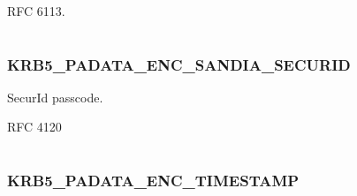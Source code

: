 \documentclass[letterpaper,10pt,english]{sphinxmanual}
\begin{document}
RFC 6113.

\begin{tabulary}{\linewidth}{|L|L|}
\hline

 & 
\\\hline
\end{tabulary}



\subsubsection{KRB5\_PADATA\_ENC\_SANDIA\_SECURID}
\label{appdev/refs/macros/KRB5_PADATA_ENC_SANDIA_SECURID:krb5-padata-enc-sandia-securid-data}\label{appdev/refs/macros/KRB5_PADATA_ENC_SANDIA_SECURID:krb5-padata-enc-sandia-securid}\label{appdev/refs/macros/KRB5_PADATA_ENC_SANDIA_SECURID::doc}

\begin{fulllineitems}
\label{appdev/refs/macros/KRB5_PADATA_ENC_SANDIA_SECURID:KRB5_PADATA_ENC_SANDIA_SECURID}
\end{fulllineitems}


SecurId passcode.

RFC 4120

\begin{tabulary}{\linewidth}{|L|L|}
\hline

 & 
\\\hline
\end{tabulary}



\subsubsection{KRB5\_PADATA\_ENC\_TIMESTAMP}
\label{appdev/refs/macros/KRB5_PADATA_ENC_TIMESTAMP::doc}\label{appdev/refs/macros/KRB5_PADATA_ENC_TIMESTAMP:krb5-padata-enc-timestamp}\label{appdev/refs/macros/KRB5_PADATA_ENC_TIMESTAMP:krb5-padata-enc-timestamp-data}

\begin{fulllineitems}
\label{appdev/refs/macros/KRB5_PADATA_ENC_TIMESTAMP:KRB5_PADATA_ENC_TIMESTAMP}
\end{fulllineitems}
\end{document}
